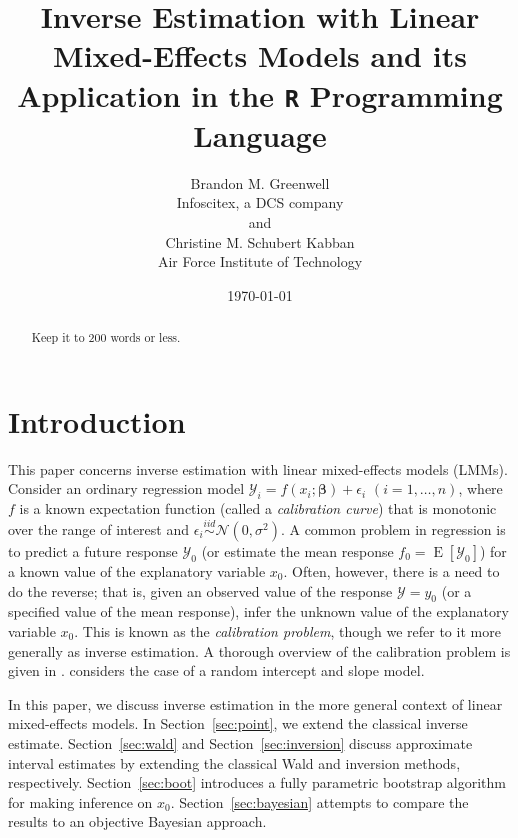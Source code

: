 \documentclass{article}\usepackage[]{graphicx}\usepackage[]{color}
\title{Inverse Estimation with Linear Mixed-Effects Models and its Application in the \texttt{R} Programming Language}
\author{Brandon M. Greenwell\\Infoscitex, a DCS company \\ and \\
        Christine M. Schubert Kabban\\Air Force Institute of Technology}
\date{\today}
\newcommand{\E}{\operatorname{E}}
\begin{document}
\maketitle





\begin{abstract}
Keep it to 200 words or less.
\end{abstract}


\section{Introduction}

This paper concerns inverse estimation with linear mixed-effects models (LMMs). Consider an ordinary regression model $\mathcal{Y}_i = f\left(x_i; \bm{\beta} \right) + \epsilon_i$ $(i = 1, \dotsc, n)$, where $f$ is a known expectation function (called a \emph{calibration curve}) that is monotonic over the range of interest and $\epsilon_i \stackrel{iid}{\sim} \mathcal{N}\left( 0, \sigma^2 \right)$.  A common problem in regression is to predict a future response $\mathcal{Y}_0$ (or estimate the mean response $f_0 = \E\left[\mathcal{Y}_0\right]$) for a known value of the explanatory variable $x_0$.  Often, however, there is a need to do the reverse; that is, given an observed value of the response $\mathcal{Y} = y_0$ (or a specified value of the mean response), infer the unknown value of the explanatory variable $x_0$.  This is known as the \emph{calibration problem}, though we refer to it more generally as inverse estimation.  A thorough overview of the calibration problem is given in \citet{osborne-statistical-1991}.  \citet{oman-calibration-1998} considers the case of a random intercept and slope model. 

In this paper, we discuss inverse estimation in the more general context of linear mixed-effects models. In Section~\ref{sec:point}, we extend the classical inverse estimate. Section~\ref{sec:wald} and Section~\ref{sec:inversion} discuss approximate interval estimates by extending the classical Wald and inversion methods, respectively. Section~\ref{sec:boot} introduces a fully parametric bootstrap algorithm for making inference on $x_0$. Section~\ref{sec:bayesian} attempts to compare the results to an objective Bayesian approach.
\end{document}
